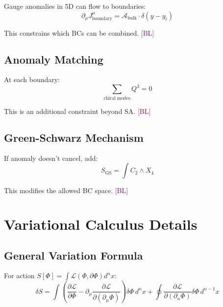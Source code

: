 \documentclass[11pt,a4paper]{article}
\newcommand{\tagBL}{\textcolor{purple}{[BL]}}
\begin{document}
Gauge anomalies in 5D can flow to boundaries:
\begin{equation}
\label{eq:anomaly-inflow}
\partial_\mu J^\mu_{\text{boundary}} = \mathcal{A}_{\text{bulk}} \cdot \delta(y - y_i)
\end{equation}

This constrains which BCs can be combined. \tagBL

\subsection{Anomaly Matching}

At each boundary:
\begin{equation}
\label{eq:anomaly-match}
\sum_{\text{chiral modes}} Q^3 = 0
\end{equation}

This is an additional constraint beyond SA. \tagBL

\subsection{Green-Schwarz Mechanism}

If anomaly doesn't cancel, add:
\begin{equation}
\label{eq:gs}
S_{\text{GS}} = \int C_2 \wedge X_4
\end{equation}

This modifies the allowed BC space. \tagBL

\appendix

\section{Variational Calculus Details}
\label{app:var}

\subsection{General Variation Formula}

For action $S[\Phi] = \int \mathcal{L}(\Phi, \partial \Phi) d^nx$:
\begin{equation}
\label{eq:app-var}
\delta S = \int \left( \frac{\partial \mathcal{L}}{\partial \Phi} - \partial_\mu \frac{\partial \mathcal{L}}{\partial(\partial_\mu \Phi)} \right) \delta\Phi \, d^nx
+ \oint \frac{\partial \mathcal{L}}{\partial(\partial_n \Phi)} \delta\Phi \, d^{n-1}x
\end{equation}
\end{document}
